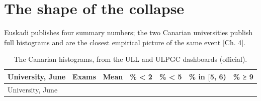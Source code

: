 \documentclass[
  10.5pt,
  a4paper,
  DIV=11,
  numbers=noendperiod]{scrartcl}
\begin{document}
\section{The shape of the collapse}\label{the-shape-of-the-collapse}

Euskadi publishes four summary numbers; the two Canarian universities
publish full histograms and are the closest empirical picture of the
same event {[}Ch. 4{]}.

\begin{longtable}[]{@{}
  >{\raggedright\arraybackslash}p{}
  >{\raggedleft\arraybackslash}p{}
  >{\raggedleft\arraybackslash}p{}
  >{\raggedleft\arraybackslash}p{}
  >{\raggedleft\arraybackslash}p{}
  >{\raggedleft\arraybackslash}p{}
  >{\raggedleft\arraybackslash}p{}@{}}
\caption{The Canarian histograms, from the ULL and ULPGC dashboards
(official).}\label{tbl-b-canarias}\tabularnewline
\toprule\noalign{}
\begin{minipage}[b]{\linewidth}\raggedright
University, June
\end{minipage} & \begin{minipage}[b]{\linewidth}\raggedleft
Exams
\end{minipage} & \begin{minipage}[b]{\linewidth}\raggedleft
Mean
\end{minipage} & \begin{minipage}[b]{\linewidth}\raggedleft
\% \textless{} 2
\end{minipage} & \begin{minipage}[b]{\linewidth}\raggedleft
\% \textless{} 5
\end{minipage} & \begin{minipage}[b]{\linewidth}\raggedleft
\% in {[}5, 6)
\end{minipage} & \begin{minipage}[b]{\linewidth}\raggedleft
\% ≥ 9
\end{minipage} \\
\midrule\noalign{}
\endfirsthead
\toprule\noalign{}
\begin{minipage}[b]{\linewidth}\raggedright
University, June
\end{minipage} & \begin{minipage}[b]{\linewidth}\raggedleft

\end{minipage}
\end{longtable}
\end{document}

